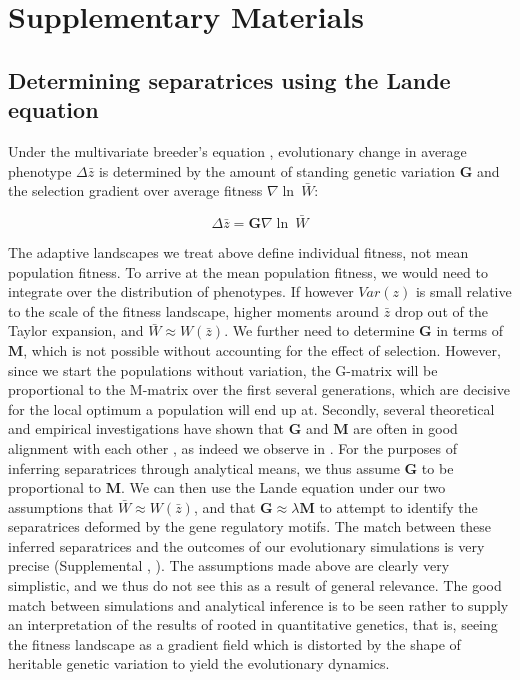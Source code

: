 \section{Supplementary Materials}

\subsection{Determining separatrices using the Lande equation}

Under the multivariate breeder's equation \parencite{lande1979quantitative}, evolutionary change in average phenotype $\Delta \bar{z}$ is determined by the amount of standing genetic variation $\mathbf{G}$ and the selection gradient over average fitness $\nabla \ln\ \bar W $:

\begin{equation}
\label{eq:CLT}
\Delta \bar{z}=\mathbf{G}\nabla \ln\ \bar W 
\end{equation}

The adaptive landscapes we treat above define individual fitness, not mean population fitness.
To arrive at the mean population fitness, we would need to integrate over the distribution of phenotypes.
If however $Var(z)$ is small relative to the scale of the fitness landscape, higher moments around $\bar{z}$ drop out of the Taylor expansion, and $\bar{W}\approx W(\bar{z})$.
We further need to determine $\mathbf{G}$ in terms of $\mathbf{M}$, which is not possible without accounting for the effect of selection.
However, since we start the populations without variation, the G-matrix will be proportional to the M-matrix over the first several generations, which are decisive for the local optimum a population will end up at.
Secondly, several theoretical and empirical investigations have shown that $\mathbf{G}$ and $\mathbf{M}$ are often in good alignment with each other \parencite{milocco2022evolution, Houle2017-ph}, as indeed we observe in .
For the purposes of inferring separatrices through analytical means, we thus assume $\mathbf{G}$ to be proportional to $\mathbf{M}$.
We can then use the Lande equation under our two assumptions that $\bar{W}\approx W(\bar{z})$, and that $\mathbf{G} \approx \lambda \mathbf{M}$ to attempt to identify the separatrices deformed by the gene regulatory motifs.
The match between these inferred separatrices and the outcomes of our evolutionary simulations is very precise (Supplemental , ).
The assumptions made above are clearly very simplistic, and we thus do not see this as a result of general relevance.
The good match between simulations and analytical inference is to be seen rather to supply an interpretation of the results of  rooted in quantitative genetics, that is, seeing the fitness landscape as a gradient field which is distorted by the shape of heritable genetic variation to yield the evolutionary dynamics.




